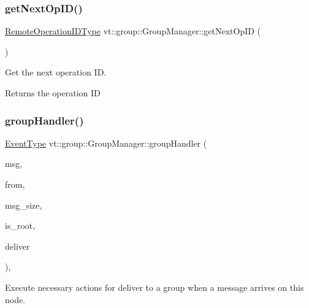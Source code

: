 \subsubsection{\texorpdfstring{get\+Next\+Op\+I\+D()}{getNextOpID()}}
{\footnotesize\ttfamily \hyperlink{namespacevt_1_1group_a73f2624ddeb535b39a08b6524f26b244}{Remote\+Operation\+I\+D\+Type} vt\+::group\+::\+Group\+Manager\+::get\+Next\+Op\+ID (\begin{DoxyParamCaption}{ }\end{DoxyParamCaption})}



Get the next operation ID. 

\begin{DoxyReturn}{Returns}
the operation ID 
\end{DoxyReturn}
\mbox{\label{structvt_1_1group_1_1_group_manager_ae0ce8441ff4ce04493ff029c2f7ba027}} 
\subsubsection{\texorpdfstring{group\+Handler()}{groupHandler()}}
{\footnotesize\ttfamily \hyperlink{namespacevt_a009267401def7ae8bf201892222d060f}{Event\+Type} vt\+::group\+::\+Group\+Manager\+::group\+Handler (\begin{DoxyParamCaption}\item[{\hyperlink{namespacevt_ab2b3d506ec8e8d1540aede826d84a239}{Msg\+Shared\+Ptr}$<$ \hyperlink{namespacevt_a44d0d4e144748f2b19a1cfd962f50338}{Base\+Msg\+Type} $>$ const \&}]{msg,  }\item[{\hyperlink{namespacevt_a866da9d0efc19c0a1ce79e9e492f47e2}{Node\+Type} const}]{from,  }\item[{\hyperlink{namespacevt_abfa009d900299ac1df967b40ea8f2c8a}{Msg\+Size\+Type} const}]{msg\+\_\+size,  }\item[{bool const}]{is\+\_\+root,  }\item[{bool $\ast$const}]{deliver }\end{DoxyParamCaption})\hspace{0.3cm}{\ttfamily [static]}, {\ttfamily [private]}}



Execute necessary actions for deliver to a group when a message arrives on this node. 


